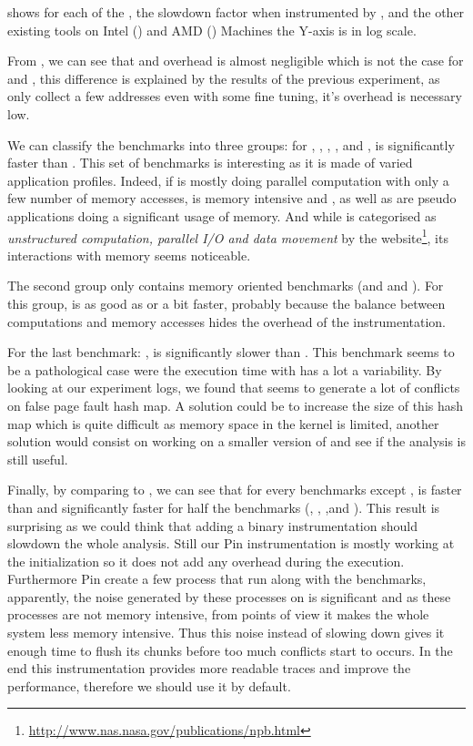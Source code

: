  shows for each of the \NPB, the slowdown factor when
instrumented by \Moca, \MocaPin and the other existing tools on Intel
() and AMD () Machines the Y-axis is in
log scale.

From , we can see that \Mitos and \MitosTun overhead is
almost negligible which is not the case for \Moca and \TABARNAC, this
difference is explained by the results of the previous experiment, as \Mitos
only collect a few addresses even with some fine tuning, it's overhead is
necessary low.

We can classify the benchmarks into three groups:
for \BT, \CG, \EP, \LU, \SP and \UA, \Moca is
significantly faster than \TABARNAC. This set of benchmarks is interesting as it is made of varied application profiles.
Indeed, if \EP is mostly doing parallel computation with only a few number of
memory accesses, \CG is memory intensive and
\BT, \LU as well as \SP are pseudo applications doing a significant usage of memory.
And while \UA is categorised as \emph{unstructured computation,
parallel I/O and data movement} by the \NPB
website\footnote{\url{http://www.nas.nasa.gov/publications/npb.html}}, its
interactions with memory seems noticeable.

The second group only contains memory oriented benchmarks (\DC and \FT and
\IS). For this group, \Moca is as good as \TABARNAC or a bit faster, probably
because the balance between computations and memory accesses hides the
overhead of the instrumentation.

For the last benchmark: \MG, \Moca is significantly slower than \TABARNAC. This benchmark
seems to be a pathological case were the execution time with \Moca has a lot a
variability. By looking at our experiment logs, we found that \MG seems to
generate a lot of conflicts on \Moca false page fault hash map. A solution
could be to increase the size of this hash map which is quite difficult as
memory space in the kernel is limited, another solution would consist on
working on a smaller version of \MG and see if the analysis is still useful.


Finally, by comparing \Moca to \MocaPin, we can see that for every benchmarks
except \DC, \MocaPin is faster than \Moca and significantly faster for half
the benchmarks (\MG, \SP, \CG,\FT and \IS). This result is surprising
as we could think that adding a binary instrumentation should slowdown the
whole analysis. Still our Pin instrumentation is mostly working at the
initialization so it does not add any overhead during the execution.
Furthermore Pin create a few process that run along with the benchmarks,
apparently, the noise generated by these processes on \Moca is significant and
as these processes are not memory intensive, from \Moca points of view it
makes the whole system less memory intensive. Thus this noise instead of
slowing \Moca down gives it enough time to flush its chunks before too much
conflicts start to occurs. In the end this instrumentation provides more
readable traces and improve the performance, therefore we should use it by
default.

